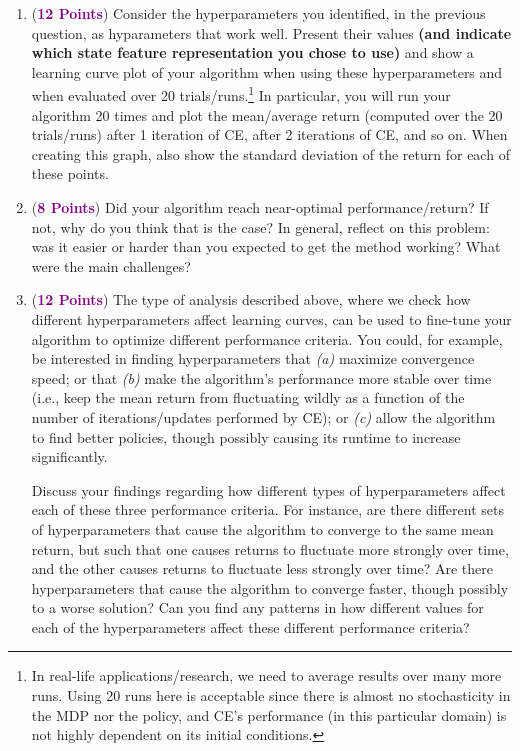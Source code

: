 \documentclass{article}
\newcommand{\POINTS}[1]{\textcolor{purple}{\textbf{{#1}}}}
\begin{document}
\begin{enumerate}
    
    \item (\POINTS{12 Points}) Consider the hyperparameters you identified, in the previous question, as hyparameters that work well. Present their values \textbf{(and indicate which state feature representation you chose to use)} and show a learning curve plot of your algorithm when using these hyperparameters and when evaluated over 20 trials/runs.\footnote{In real-life applications/research, we need to average results over many more runs. Using 20 runs here is acceptable since there is almost no stochasticity in the MDP nor the policy, and CE's performance (in this particular domain) is not highly dependent on its initial conditions.} In particular, you will run your algorithm 20 times and plot the mean/average return (computed over the 20 trials/runs) after 1 iteration of CE, after 2 iterations of CE, and so on. When creating this graph, also show the standard deviation of the return for each of these points.
    

    \item (\POINTS{8 Points}) Did your algorithm reach near-optimal performance/return? If not, why do you think that is the case? In general, reflect on this problem: was it easier or harder than you expected to get the method working? What were the main challenges?
    
    
    \item (\POINTS{12 Points}) The type of analysis described above, where we check how different hyperparameters affect learning curves, can be used to fine-tune your algorithm to optimize different performance criteria. You could, for example, be interested in finding hyperparameters that \textit{(a)} maximize convergence speed; or that \textit{(b)} make the algorithm's performance more stable over time (i.e., keep the mean return from fluctuating wildly as a function of the number of iterations/updates performed by CE); or \textit{(c)} allow the algorithm to find better policies, though possibly causing its runtime to increase significantly. 
    
    Discuss your findings regarding how different types of hyperparameters affect each of these three performance criteria. For instance, are there different sets of hyperparameters that cause the algorithm to converge to the same mean return, but such that one causes returns to fluctuate more strongly over time, and the other causes returns to fluctuate less strongly over time? Are there hyperparameters that cause the algorithm to converge faster, though possibly to a worse solution? Can you find any patterns in how different values for each of the hyperparameters affect these different performance criteria?
    
    

\end{enumerate}




\end{document}
